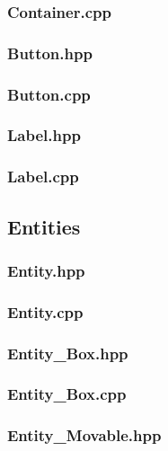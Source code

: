 \subsubsection{Container.cpp}

\subsubsection{Button.hpp}

\subsubsection{Button.cpp}

\subsubsection{Label.hpp}

\subsubsection{Label.cpp}


\subsection{Entities}
\subsubsection{Entity.hpp}

\subsubsection{Entity.cpp}

\subsubsection{Entity\_Box.hpp}

\subsubsection{Entity\_Box.cpp}

\subsubsection{Entity\_Movable.hpp}

